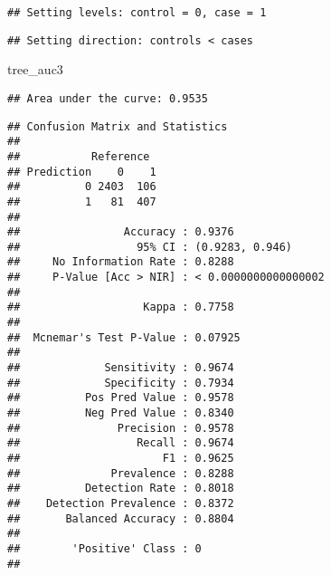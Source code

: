 \documentclass[
]{article}
\newenvironment{Shaded}{\begin{snugshade}}{\end{snugshade}}
\newcommand{\AttributeTok}[1]{\textcolor[rgb]{0.13,0.29,0.53}{#1}}
\newcommand{\FunctionTok}[1]{\textcolor[rgb]{0.13,0.29,0.53}{\textbf{#1}}}
\newcommand{\NormalTok}[1]{#1}
\newcommand{\OtherTok}[1]{\textcolor[rgb]{0.56,0.35,0.01}{#1}}
\newcommand{\SpecialCharTok}[1]{\textcolor[rgb]{0.81,0.36,0.00}{\textbf{#1}}}
\newcommand{\StringTok}[1]{\textcolor[rgb]{0.31,0.60,0.02}{#1}}
\begin{document}
\begin{verbatim}
## Setting levels: control = 0, case = 1
\end{verbatim}

\begin{verbatim}
## Setting direction: controls < cases
\end{verbatim}

\begin{Shaded}
\begin{Highlighting}[]
\NormalTok{tree\_auc3}
\end{Highlighting}
\end{Shaded}

\begin{verbatim}
## Area under the curve: 0.9535
\end{verbatim}

\begin{Shaded}
\end{Shaded}

\begin{verbatim}
## Confusion Matrix and Statistics
## 
##           Reference
## Prediction    0    1
##          0 2403  106
##          1   81  407
##                                               
##                Accuracy : 0.9376              
##                  95% CI : (0.9283, 0.946)     
##     No Information Rate : 0.8288              
##     P-Value [Acc > NIR] : < 0.0000000000000002
##                                               
##                   Kappa : 0.7758              
##                                               
##  Mcnemar's Test P-Value : 0.07925             
##                                               
##             Sensitivity : 0.9674              
##             Specificity : 0.7934              
##          Pos Pred Value : 0.9578              
##          Neg Pred Value : 0.8340              
##               Precision : 0.9578              
##                  Recall : 0.9674              
##                      F1 : 0.9625              
##              Prevalence : 0.8288              
##          Detection Rate : 0.8018              
##    Detection Prevalence : 0.8372              
##       Balanced Accuracy : 0.8804              
##                                               
##        'Positive' Class : 0                   
## 
\end{verbatim}
\end{document}
